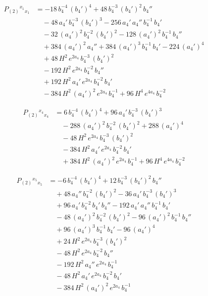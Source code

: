 \documentclass[11pt]{article}
\begin{document}
\[
\begin{aligned}
P_{(2)}{}^{x_1}{}_{x_1} &= -18\,b_4^{-4}\,(b_4')^{4} + 48\,b_4^{-3}\,(b_4')^{2}\,b_4'' \\
&\quad - 48\,a_4'\,b_4^{-3}\,(b_4')^{3} - 256\,a_4'\,a_4''\,b_4^{-1}\,b_4' \\
&\quad - 32\,(a_4')^{2}\,b_4^{-2}\,(b_4')^{2} - 128\,(a_4')^{2}\,b_4^{-1}\,b_4'' \\
&\quad + 384\,(a_4')^{2}\,a_4'' + 384\,(a_4')^{3}\,b_4^{-1}\,b_4' - 224\,(a_4')^{4} \\
&\quad + 48\,H^{2}\,e^{2 a_4}\,b_4^{-3}\,(b_4')^{2} \\
&\quad - 192\,H^{2}\,e^{2 a_4}\,b_4^{-2}\,b_4'' \\
&\quad + 192\,H^{2}\,a_4'\,e^{2 a_4}\,b_4^{-2}\,b_4' \\
&\quad - 384\,H^{2}\,(a_4')^{2}\,e^{2 a_4}\,b_4^{-1} + 96\,H^{4}\,e^{4 a_4}\,b_4^{-2}
\end{aligned}
\]

\[
\begin{aligned}
P_{(2)}{}^{x_4}{}_{x_4} &= 6\,b_4^{-4}\,(b_4')^{4} + 96\,a_4'\,b_4^{-3}\,(b_4')^{3} \\
&\quad - 288\,(a_4')^{2}\,b_4^{-2}\,(b_4')^{2} + 288\,(a_4')^{4} \\
&\quad - 48\,H^{2}\,e^{2 a_4}\,b_4^{-3}\,(b_4')^{2} \\
&\quad - 384\,H^{2}\,a_4'\,e^{2 a_4}\,b_4^{-2}\,b_4' \\
&\quad + 384\,H^{2}\,(a_4')^{2}\,e^{2 a_4}\,b_4^{-1} + 96\,H^{4}\,e^{4 a_4}\,b_4^{-2}
\end{aligned}
\]

\[
\begin{aligned}
P_{(2)}{}^{x_5}{}_{x_5} &= -6\,b_4^{-4}\,(b_4')^{4} + 12\,b_4^{-3}\,(b_4')^{2}\,b_4'' \\
&\quad + 48\,a_4''\,b_4^{-2}\,(b_4')^{2} - 36\,a_4'\,b_4^{-3}\,(b_4')^{3} \\
&\quad + 96\,a_4'\,b_4^{-2}\,b_4'\,b_4'' - 192\,a_4'\,a_4''\,b_4^{-1}\,b_4' \\
&\quad - 48\,(a_4')^{2}\,b_4^{-2}\,(b_4')^{2} - 96\,(a_4')^{2}\,b_4^{-1}\,b_4'' \\
&\quad + 96\,(a_4')^{3}\,b_4^{-1}\,b_4' - 96\,(a_4')^{4} \\
&\quad + 24\,H^{2}\,e^{2 a_4}\,b_4^{-3}\,(b_4')^{2} \\
&\quad - 48\,H^{2}\,e^{2 a_4}\,b_4^{-2}\,b_4'' \\
&\quad - 192\,H^{2}\,a_4''\,e^{2 a_4}\,b_4^{-1} \\
&\quad - 48\,H^{2}\,a_4'\,e^{2 a_4}\,b_4^{-2}\,b_4' \\
&\quad - 384\,H^{2}\,(a_4')^{2}\,e^{2 a_4}\,b_4^{-1}
\end{aligned}
\]
\end{document}
